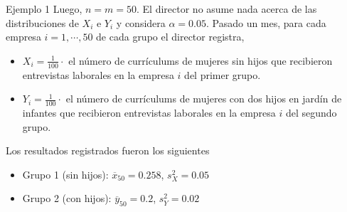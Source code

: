 \documentclass{beamer}
\theoremstyle{definition}
\begin{document}
\begin{frame}{\color{rosee} Ejemplo 1} \small
Luego, $n=m=50$. El director no asume nada acerca de las distribuciones de $X_i$ e $Y_i$ y considera $\alpha=0.05$.
\medskip
Pasado un mes, para cada empresa $i=1,\cdots, 50$ de cada grupo el director registra,
\begin{itemize}
    \item  $X_i=\frac{1}{100} \cdot$ el número de currículums de mujeres sin hijos que recibieron entrevistas laborales en la empresa $i$ del primer grupo.
\item  $Y_i=\frac{1}{100} \cdot$ el número de currículums de mujeres con dos hijos en jard\'in de infantes que recibieron entrevistas laborales en la empresa $i$ del segundo grupo.
\end{itemize}
Los resultados registrados fueron los siguientes
\begin{itemize}
\item Grupo 1 (sin hijos): $\overline{x}_{50}=0.258$, $s_X^2=0.05$ %
\item Grupo 2 (con hijos): $\overline{y}_{50}=0.2$, $s_Y^2=0.02$ %
\end{itemize}
\end{frame}
\end{document}
